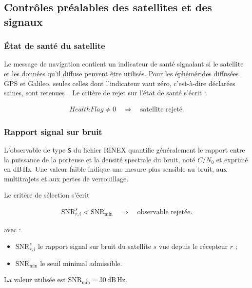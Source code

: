 \subsection{Contrôles préalables des satellites et des signaux}

\subsubsection{État de santé du satellite}

Le message de navigation contient un indicateur de santé signalant si le
satellite et les données qu'il diffuse peuvent être utilisés. Pour les
éphémérides diffusées GPS et Galileo, seules celles dont l'indicateur vaut zéro,
c'est-à-dire déclarées saines, sont retenues~\cite{isgps200n,galileoOsSisIcd21}.
Le critère de rejet sur l'état de santé s'écrit :

\begin{align}
    Health Flag \neq 0
    \quad\Longrightarrow\quad
    \text{satellite rejeté}.
\end{align}

\subsubsection{Rapport signal sur bruit}

L'observable de type \texttt{S} du fichier RINEX quantifie généralement le
rapport entre la puissance de la porteuse et la densité spectrale du bruit,
noté $C/N_0$ et exprimé en $\mathrm{dB\,Hz}$. Une valeur faible indique une
mesure plus sensible au bruit, aux multitrajets et aux pertes de verrouillage.

Le critère de sélection s'écrit

\begin{align}
\mathrm{SNR}_{r,i}^s
<
\mathrm{SNR}_{\min}
\quad\Longrightarrow\quad
\text{observable rejetée}.
\label{eq:snr_threshold}
\end{align}

avec :

\begin{itemize}
    \item $\mathrm{SNR}_{r,i}^s$ le rapport signal sur bruit du satellite $s$ vue depuis le récepteur $r$ ;
    \item $\mathrm{SNR}_{\min}$ le seuil minimal admissible.
\end{itemize}

La valeur utilisée est $\mathrm{SNR}_{\min}=30\,\mathrm{dB\,Hz}$.

